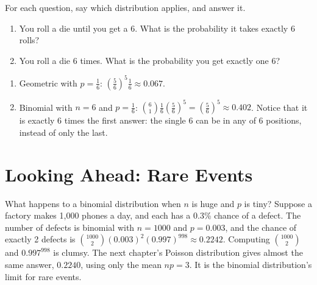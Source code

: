 \begin{Exercise}[title={Binomial or Geometric?}, label=bg_which]
For each question, say which distribution applies, and answer it.
\begin{enumerate}
\item You roll a die until you get a 6. What is the probability it takes exactly 6 rolls?
\item You roll a die 6 times. What is the probability you get exactly one 6?
\end{enumerate}
\end{Exercise}
\begin{Answer}[ref=bg_which]
\begin{enumerate}
\item Geometric with $p = \frac{1}{6}$: $\left(\frac{5}{6}\right)^5\frac{1}{6} \approx 0.067$.
\item Binomial with $n = 6$ and $p = \frac{1}{6}$:
$\binom{6}{1}\frac{1}{6}\left(\frac{5}{6}\right)^5 = \left(\frac{5}{6}\right)^5 \approx 0.402$.
Notice that it is exactly 6 times the first answer: the single 6 can be in any of 6
positions, instead of only the last.
\end{enumerate}
\end{Answer}

\section{Looking Ahead: Rare Events}
What happens to a binomial distribution when $n$ is huge and $p$ is tiny? Suppose a
factory makes 1,000 phones a day, and each has a 0.3\% chance of a defect. The
number of defects is binomial with $n = 1000$ and $p = 0.003$, and the chance of
exactly 2 defects is $\binom{1000}{2}(0.003)^2(0.997)^{998} \approx 0.2242$. Computing
$\binom{1000}{2}$ and $0.997^{998}$ is clumsy. The next chapter's Poisson distribution
gives almost the same answer, $0.2240$, using only the mean $np = 3$. It is the
binomial distribution's limit for rare events.
